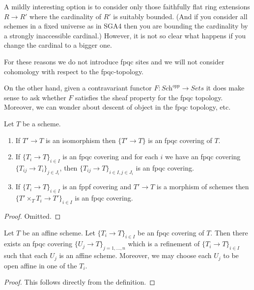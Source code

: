 \medskip\noindent
A mildly interesting option is to consider only those faithfully flat ring
extensions $R \to R'$ where the cardinality of $R'$ is suitably bounded.
(And if you consider all schemes in a fixed universe as in SGA4 then you
are bounding the cardinality by a strongly inaccessible cardinal.)
However, it is not so clear what happens if you change the cardinal
to a bigger one.

\medskip\noindent
For these reasons we do not introduce fpqc sites and we will not consider
cohomology with respect to the fpqc-topology.

\medskip\noindent
On the other hand, given a contravariant functor
$F : \textit{Sch}^{opp} \to \textit{Sets}$
it does make sense to ask whether $F$ satisfies the sheaf property
for the fpqc topology. Moreover, we can wonder about descent of object
in the fpqc topology, etc.

\begin{lemma}
\label{lemma-fpqc}
Let $T$ be a scheme.
\begin{enumerate}
\item If $T' \to T$ is an isomorphism then $\{T' \to T\}$
is an fpqc covering of $T$.
\item If $\{T_i \to T\}_{i\in I}$ is an fpqc covering and for each
$i$ we have an fpqc covering $\{T_{ij} \to T_i\}_{j\in J_i}$, then
$\{T_{ij} \to T\}_{i \in I, j\in J_i}$ is an fpqc covering.
\item If $\{T_i \to T\}_{i\in I}$ is an fppf covering
and $T' \to T$ is a morphism of schemes then
$\{T' \times_T T_i \to T'\}_{i\in I}$ is an fpqc covering.
\end{enumerate}
\end{lemma}

\begin{proof}
Omitted.
\end{proof}

\begin{lemma}
\label{lemma-fpqc-affine}
Let $T$ be an affine scheme.
Let $\{T_i \to T\}_{i \in I}$ be an fpqc covering of $T$.
Then there exists an fpqc covering
$\{U_j \to T\}_{j = 1, \ldots, n}$ which is a refinement
of $\{T_i \to T\}_{i \in I}$ such that each $U_j$ is an affine
scheme. Moreover, we may choose each $U_j$ to be open affine
in one of the $T_i$.
\end{lemma}

\begin{proof}
This follows directly from the definition.
\end{proof}

